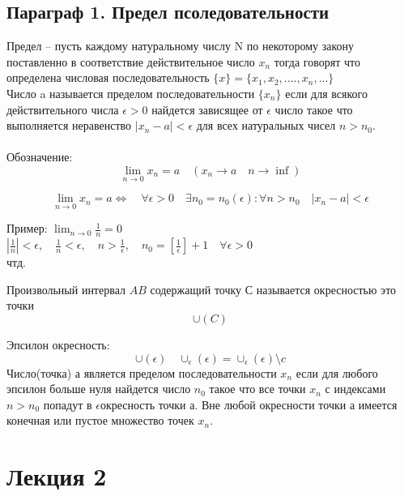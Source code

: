 \documentclass[a4paper, 12pt]{article}
\begin{document}
\subsection{Параграф 1. Предел псоледовательности}
Предел -- пусть каждому натуральному числу N по некоторому закону поставленно в соответствие действительное число $ x_n $ тогда говорят что определена числовая последовательность $ \{x\} = \{x_1,x_2,....,x_n,...\} $ \\
Число a называется пределом последовательности $ \{x_n\}  $ если для всякого действительного числа $ \epsilon  > 0$ найдется зависящее от $ \epsilon $ число такое что выполняется неравенство $ |x_n - a| < \epsilon  $ для всех натуральных чисел $ n > n_0 $.  \\
\\Обозначение:\\
\[
	\lim_{n\to 0} x_n  = a \quad(x_n \to a \quad n \to \inf)	
\]
 
 \[
 	\lim_{n\to 0} x_n = a \Leftrightarrow  \quad \forall \epsilon > 0 \quad \exists n_0 = n_0(\epsilon): \forall n > n_0 \quad |x_n -a| < \epsilon
 \]
\begin{mdframed}[backgroundcolor=blue!20] 
       Пример: $  \lim_{n\to 0} \frac{1}{n}=0 $\\
       $|\frac{1}{n}| < \epsilon, \quad \frac{1}{n} < \epsilon, \quad n > \frac{1}{\epsilon}, \quad n_0 = \left[\frac{1}{\epsilon}\right] + 1 \quad \forall \epsilon>0 $\\
       чтд.
    \end{mdframed}
Произвольный интервал $ AB $ содержащий точку С называется окресностью это точки\\
\[
	\cup(C)	
\]

Эпсилон окресность:\\
\[
	\cup(\epsilon)	\quad {\cup_\epsilon}(\epsilon) = \cup_\epsilon(\epsilon) \setminus {c}
\]
Число(точка) а является пределом последовательности $ x_n $
если для любого эпсилон больше нуля найдется число $ n_0 $ такое что все точки $ x_n $ с индексами $  n > n_0$ попадут в $ \epsilon $окресность точки а. Вне любой окресности точки а имеется конечная или пустое множество точек $ x_n $.


\section*{Лекция 2}
\end{document}
